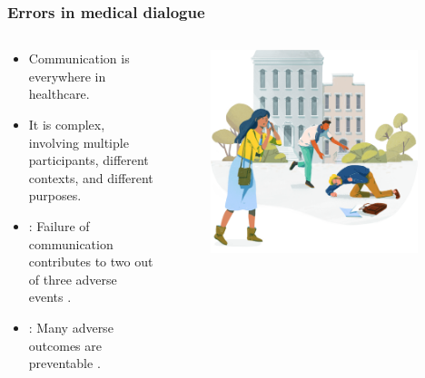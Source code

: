 \begin{frame}
    \frametitle{Errors in medical dialogue}
    \begin{columns}
        \begin{column}{0.5\textwidth}
            \begin{itemize}
                \item <1-> Communication is everywhere in healthcare. 
                \item <1-> It is complex, involving multiple participants, different contexts, and different purposes.
                \vspace{1em}
                \item <2-> : Failure of communication contributes to two out of three adverse events \cite{starmer_changes_2014}.
                \item <2-> : Many adverse outcomes are preventable \cite{carver_medical_2024}.
            \end{itemize}
        \end{column}
        \begin{column}{0.5\textwidth}
            \begin{figure}
                \centering
                \includegraphics[width=0.95\textwidth]{figures/corti_sketch_emergency.png}
            \end{figure}
        \end{column}
    \end{columns}

\end{frame}


